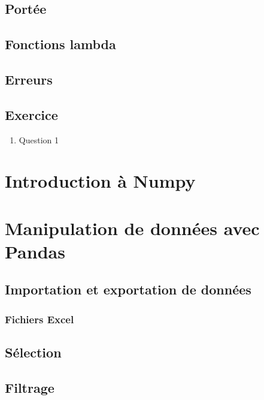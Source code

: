\documentclass[12pt,]{book}
\providecommand{\tightlist}{%
  \setlength{\itemsep}{0pt}\setlength{\parskip}{0pt}}
\numberwithin{equation}{section}
\numberwithin{countremarque}{section}
\let\BeginKnitrBlock\begin \let\EndKnitrBlock\end
\begin{document}
\section{Portée}\label{portee}

\section{Fonctions lambda}\label{fonctions-lambda}

\section{Erreurs}\label{erreurs}

\section{Exercice}\label{exercice-6}

\BeginKnitrBlock{exframe}
\begin{enumerate}
\def\labelenumi{\arabic{enumi}.}
\tightlist
\item
  Question 1
\end{enumerate}
\EndKnitrBlock{exframe}

\chapter{Introduction à Numpy}\label{numpy}

\chapter{Manipulation de données avec Pandas}\label{pandas}

\section{Importation et exportation de
données}\label{importation-et-exportation-de-donnees}

\subsection{Fichiers Excel}\label{pandas-importation-excel}

\section{Sélection}\label{selection}

\section{Filtrage}\label{filtrage}
\end{document}
